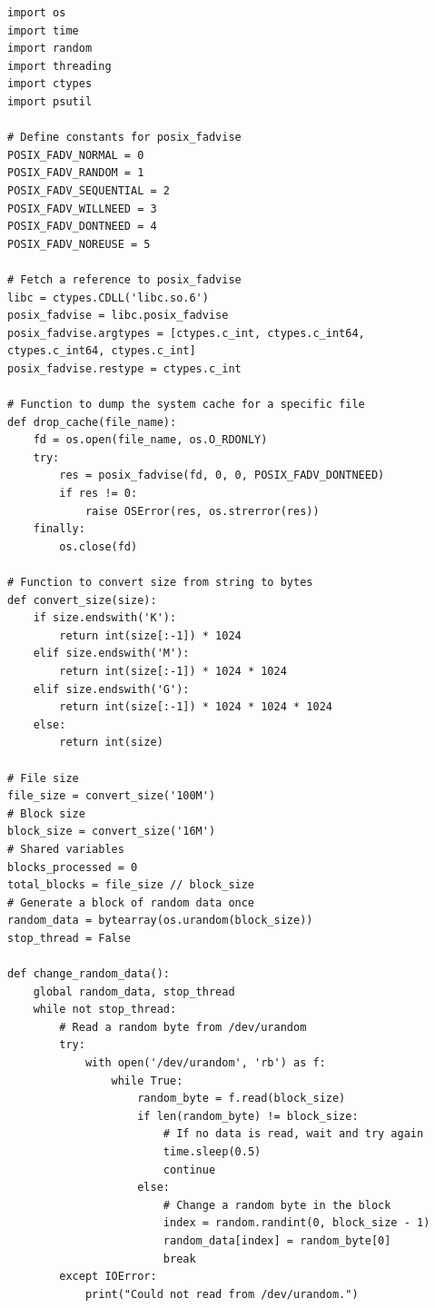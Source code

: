 \begin{lstlisting}[style=Python, caption=Script Python per il benchmarking, label=python-benchmark.py]
import os
import time
import random
import threading
import ctypes
import psutil

# Define constants for posix_fadvise
POSIX_FADV_NORMAL = 0
POSIX_FADV_RANDOM = 1
POSIX_FADV_SEQUENTIAL = 2
POSIX_FADV_WILLNEED = 3
POSIX_FADV_DONTNEED = 4
POSIX_FADV_NOREUSE = 5

# Fetch a reference to posix_fadvise
libc = ctypes.CDLL('libc.so.6')
posix_fadvise = libc.posix_fadvise
posix_fadvise.argtypes = [ctypes.c_int, ctypes.c_int64, ctypes.c_int64, ctypes.c_int]
posix_fadvise.restype = ctypes.c_int

# Function to dump the system cache for a specific file
def drop_cache(file_name):
    fd = os.open(file_name, os.O_RDONLY)
    try:
        res = posix_fadvise(fd, 0, 0, POSIX_FADV_DONTNEED)
        if res != 0:
            raise OSError(res, os.strerror(res))
    finally:
        os.close(fd)

# Function to convert size from string to bytes
def convert_size(size):
    if size.endswith('K'):
        return int(size[:-1]) * 1024
    elif size.endswith('M'):
        return int(size[:-1]) * 1024 * 1024
    elif size.endswith('G'):
        return int(size[:-1]) * 1024 * 1024 * 1024
    else:
        return int(size)

# File size
file_size = convert_size('100M')
# Block size
block_size = convert_size('16M')
# Shared variables
blocks_processed = 0
total_blocks = file_size // block_size
# Generate a block of random data once
random_data = bytearray(os.urandom(block_size))
stop_thread = False

def change_random_data():
    global random_data, stop_thread
    while not stop_thread:
        # Read a random byte from /dev/urandom
        try:
            with open('/dev/urandom', 'rb') as f:
                while True:
                    random_byte = f.read(block_size)
                    if len(random_byte) != block_size:
                        # If no data is read, wait and try again
                        time.sleep(0.5)
                        continue
                    else:
                        # Change a random byte in the block
                        index = random.randint(0, block_size - 1)
                        random_data[index] = random_byte[0]
                        break
        except IOError:
            print("Could not read from /dev/urandom.")


\end{lstlisting}
